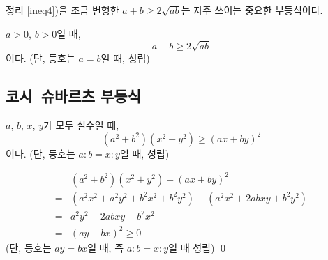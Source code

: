 \documentclass{oblivoir}
\begin{document}
\bigskip\bigskip
정리 \ref{ineq4})을 조금 변형한 \(a+b\ge2\sqrt{ab}\)는 자주 쓰이는 중요한 부등식이다.

\begin{mdframed}
%
\label{ineq5}
\(a>0\), \(b>0\)일 때,
\[a+b\ge2\sqrt{ab}\]이다.
(단, 등호는 \(a=b\)일 때, 성립)
\end{mdframed}


\newpage
%
\subsection{코시--슈바르츠 부등식}
\begin{mdframed}
%
\label{ineq6}
\(a\), \(b\), \(x\), \(y\)가 모두 실수일 때,
\[(a^2+b^2)(x^2+y^2)\ge(ax+by)^2\]이다.
(단, 등호는 \(a:b=x:y\)일 때, 성립)
\end{mdframed}
\proo{}
\begin{align*}
&(a^2+b^2)(x^2+y^2)-(ax+by)^2\\
=&(a^2x^2+a^2y^2+b^2x^2+b^2y^2)-(a^2x^2+2abxy+b^2y^2)\\
=&a^2y^2-2abxy+b^2x^2\\
=&(ay-bx)^2\ge0\quad
\end{align*}
(단, 등호는 \(ay=bx\)일 때, 즉 \(a:b=x:y\)일 때 성립)
\qed

\end{document}
